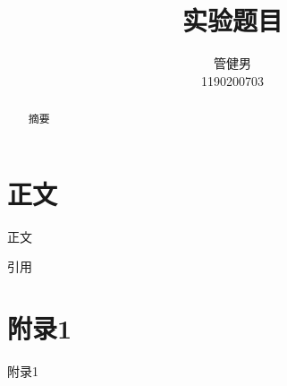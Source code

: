 \documentclass[11pt,a4paper]{article}
\title{实验题目}
\author{
  管健男 \\
  1190200703 \\
}
\date{}
\begin{document}
\maketitle

\begin{abstract}
  摘要
\end{abstract}

\section{正文}

正文

引用\citep{Aho:72}




\appendix

\section{附录1}
\label{sec:appendix}

附录1
\end{document}
